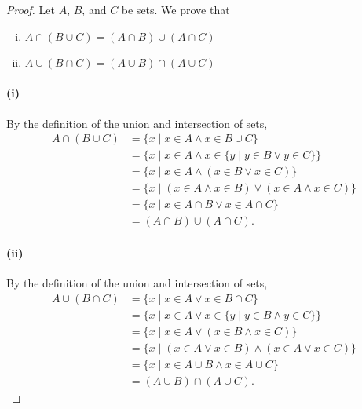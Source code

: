 \documentclass{report}
\begin{document}
\begin{proof}

  \statementpadding



  \noindent Let $A$, $B$, and $C$ be sets.
  We prove that
    \begin{enumerate}[(i)]
      \item $A \cap (B \cup C) = (A \cap B) \cup (A \cap C)$
      \item $A \cup (B \cap C) = (A \cup B) \cap (A \cup C)$
    \end{enumerate}

  \paragraph{(i)}%

    By the definition of the union and intersection of sets,
      \begin{align*}
        A \cap (B \cup C)
          & = \{ x \mid x \in A \land x \in B \cup C \} \\
          & = \{ x \mid x \in A \land
                        x \in \{ y \mid y \in B \lor y \in C \}\} \\
          & = \{ x \mid x \in A \land (x \in B \lor x \in C) \} \\
          & = \{ x \mid (x \in A \land x \in B) \lor
                        (x \in A \land x \in C) \} \\
          & = \{ x \mid x \in A \cap B \lor x \in A \cap C \} \\
          & = (A \cap B) \cup (A \cap C).
      \end{align*}

  \paragraph{(ii)}%

    By the definition of the union and intersection of sets,
      \begin{align*}
        A \cup (B \cap C)
          & = \{ x \mid x \in A \lor x \in B \cap C \} \\
          & = \{ x \mid x \in A \lor
                        x \in \{ y \mid y \in B \land y \in C \}\} \\
          & = \{ x \mid x \in A \lor (x \in B \land x \in C) \} \\
          & = \{ x \mid (x \in A \lor x \in B) \land
                        (x \in A \lor x \in C) \} \\
          & = \{ x \mid x \in A \cup B \land x \in A \cup C \} \\
          & = (A \cup B) \cap (A \cup C).
      \end{align*}

\end{proof}
\end{document}
